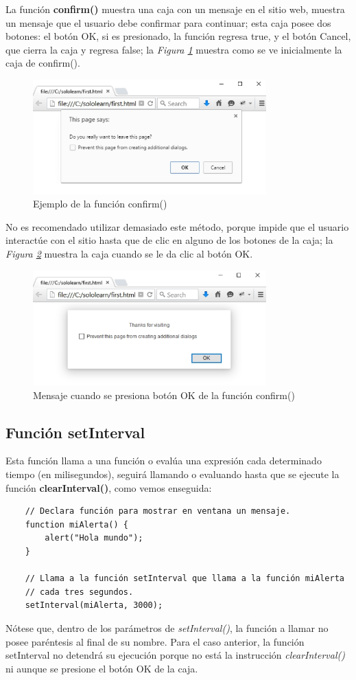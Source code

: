 La función \textbf{confirm()} muestra una caja con un mensaje en el sitio web, muestra un mensaje que el usuario debe confirmar para continuar; esta caja posee dos botones: el botón OK, si es presionado, la función regresa true, y el botón Cancel, que cierra la caja y regresa false; la \textit{Figura \ref{fig: 3}} muestra como se ve inicialmente la caja de confirm().
\begin{figure}[H]
    \caption{Ejemplo de la función confirm()}
    \label{fig: 3}
    \begin{center}
        \includegraphics [width=9cm]{ss/confirm.png}
    \end{center}
\end{figure}
No es recomendado utilizar demasiado este método, porque impide que el usuario interactúe con el sitio hasta que de clic en alguno de los botones de la caja; la \textit{Figura \ref{fig: 4}} muestra la caja cuando se le da clic al botón OK.
\begin{figure}[H]
    \caption{Mensaje cuando se presiona botón OK de la función confirm()}
    \label{fig: 4}
    \begin{center}
        \includegraphics [width=9cm]{ss/confirm_res.png}
    \end{center}
\end{figure}


\subsection{Función setInterval}
\hspace{0.55cm}Esta función llama a una función o evalúa una expresión cada determinado tiempo (en milisegundos), seguirá llamando o evaluando hasta que se ejecute la función \textbf{clearInterval()}, como vemos enseguida:
\begin{lstlisting}
    // Declara función para mostrar en ventana un mensaje.
    function miAlerta() {
        alert("Hola mundo");
    }

    // Llama a la función setInterval que llama a la función miAlerta
    // cada tres segundos.
    setInterval(miAlerta, 3000);
\end{lstlisting}

Nótese que, dentro de los parámetros de \textit{setInterval()}, la función a llamar no posee paréntesis al final de su nombre. Para el caso anterior, la función setInterval no detendrá su ejecución porque no está la instrucción \textit{clearInterval()} ni aunque se presione el botón OK de la caja.